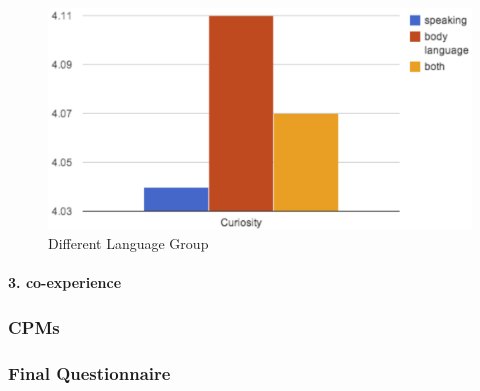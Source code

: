 \begin{figure}[!h]
\centering
\includegraphics[width=0.9\columnwidth]{Figures/US_Curi_Dif.png}
\caption{Different Language Group}
\label{fig:US_Curi_Dif}
\end{figure}


\paragraph{3. co-experience}

\subsubsection{CPMs}
\subsubsection{Final Questionnaire}


